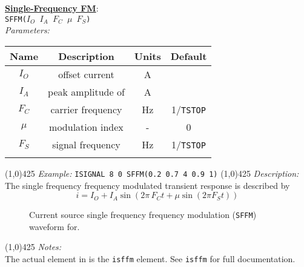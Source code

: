\underline{\bf{ Single-Frequency FM}}:\\
\texttt{SFFM($I_O$ $I_A$ $F_C$ $\mu$ $F_S$)}\\
\textit{Parameters:}
\begin{table}[h]
\begin{tabular}{|c|c|c|c|}
\hline
Name&Description&Units&Default\\
\hline
$I_O$ & offset current & A & \\
\hline
$I_A$ & peak amplitude of \ac\ current & A & \\
\hline
$F_C$ & carrier frequency & Hz & 1/{\texttt{TSTOP}}\\
\hline
$\mu$ & modulation index & - & 0\\
\hline
$F_S$ & signal frequency & Hz & 1/{\texttt{TSTOP}}\\
\par
\hline
\end{tabular}
\end{table}
\newline
\linethickness{0.5mm} \line(1,0){425}
\newline
\textit{Example:}
\newline
\texttt{ISIGNAL\ 8\ 0\ SFFM(0.2 0.7 4 0.9 1)}
\newline
\linethickness{0.5mm} \line(1,0){425}
\newline
\textit{Description:}\\
The single frequency frequency modulated transient response is
described by
\begin{equation}
i = I_O + I_A\sin{(2 \pi \, F_C t +  \mu\sin{(2 \pi F_S t)})}
\end{equation}
\begin{figure}[h]
\centering

\caption[Current source single frequency frequency modulation
({\tt SFFM}) waveform]{Current source single frequency frequency
modulation ({\tt SFFM}) waveform for\newline \hspace*{\fill}{\tt
SFFM(0.2 0.7 4 0.9 1)}\hspace*{\fill}. \label{fig:isffm}}
\end{figure}
\newline
\linethickness{0.5mm} \line(1,0){425}
\newline
\textit{Notes:}\\
The actual element in \FDA is the \texttt{isffm} element.
See \texttt{isffm} for full documentation.\\
\newline

